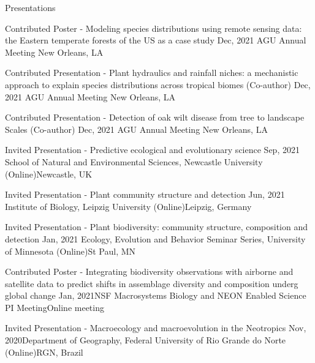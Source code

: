 \documentclass{resume} %
\begin{document}
\begin{rSection}{Presentations}
\begin{sSubsection}{Contributed Poster - Modeling species distributions using remote sensing data: the Eastern temperate forests of the US as a case study}{ }{Dec, 2021}{ AGU Annual Meeting }{New Orleans, LA}
\end{sSubsection}

\begin{sSubsection}{Contributed Presentation - Plant hydraulics and rainfall niches: a mechanistic approach to explain species distributions across tropical biomes}{ (Co-author) }{Dec, 2021}{ AGU Annual Meeting }{New Orleans, LA}
\end{sSubsection}

\begin{sSubsection}{Contributed Presentation - Detection of oak wilt disease from tree to landscape Scales}{ (Co-author) }{Dec, 2021}{ AGU Annual Meeting }{New Orleans, LA}
\end{sSubsection}

\begin{sSubsection}{Invited Presentation - Predictive ecological and evolutionary science}{ }{Sep, 2021}{ School of Natural and Environmental Sciences, Newcastle University (Online)}{Newcastle, UK}
\end{sSubsection}

\begin{sSubsection}{Invited Presentation - Plant community structure and detection}{ }{Jun, 2021}{ Institute of Biology, Leipzig University (Online)}{Leipzig, Germany}
\end{sSubsection}

\begin{sSubsection}{Invited Presentation - Plant biodiversity: community structure, composition and detection}{ }{Jan, 2021}{ Ecology, Evolution and Behavior Seminar Series, University of Minnesota (Online)}{St Paul, MN}
\end{sSubsection}

\begin{sSubsection}{Contributed Poster - Integrating biodiversity observations with airborne and satellite data to predict shifts in assemblage diversity and composition underg global change}{ }{Jan, 2021}{NSF Macrosystems Biology and NEON Enabled Science PI Meeting}{Online meeting}
\end{sSubsection}

\begin{sSubsection}{Invited Presentation - Macroecology and macroevolution in the Neotropics}{ }{Nov, 2020}{Department of Geography, Federal University of Rio Grande do Norte (Online)}{RGN, Brazil}
\end{sSubsection}


\end{rSection}
\end{document}
